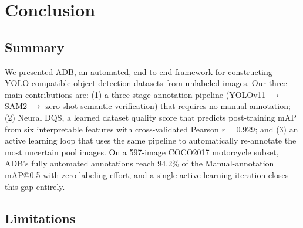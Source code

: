 \documentclass[11pt]{article}
\begin{document}
\section{Conclusion}
\label{sec:conclusion}

\subsection{Summary}

We presented ADB, an automated, end-to-end framework for constructing
YOLO-compatible object detection datasets from unlabeled images. Our three
main contributions are: (1) a three-stage annotation pipeline (YOLOv11
$\to$ SAM2 $\to$ zero-shot semantic verification) that requires no manual
annotation; (2) Neural DQS, a learned dataset quality score that predicts
post-training mAP from six interpretable features with cross-validated
Pearson $r=0.929$; and (3) an active learning loop that uses the same
pipeline to automatically re-annotate the most uncertain pool images. On a
597-image COCO2017 motorcycle subset, ADB's fully automated annotations reach
94.2\% of the Manual-annotation mAP@0.5 with zero labeling effort, and a
single active-learning iteration closes this gap entirely.

\subsection{Limitations}
\label{sec:limitations}
\end{document}
